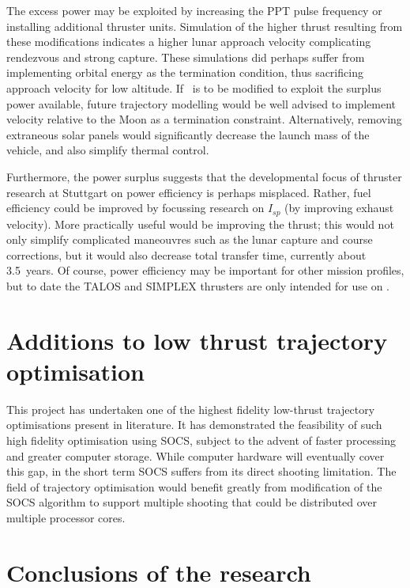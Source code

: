 The excess power may be exploited by increasing the PPT pulse frequency or installing additional thruster units. Simulation of the higher thrust resulting from these modifications indicates a higher lunar approach velocity complicating rendezvous and strong capture. These simulations did perhaps suffer from implementing orbital energy as the termination condition, thus sacrificing approach velocity for low altitude. If \BW\ is to be modified to exploit the surplus power available, future trajectory modelling would be well advised to implement velocity relative to the Moon as a termination constraint. Alternatively, removing extraneous solar panels would significantly decrease the launch mass of the vehicle, and also simplify thermal control. 

Furthermore, the power surplus suggests that the developmental focus of thruster research at Stuttgart on power efficiency is perhaps misplaced. Rather, fuel efficiency could be improved by focussing research on $I_{sp}$ (by improving exhaust velocity). More practically useful would be improving the thrust; this would not only simplify complicated maneouvres such as the lunar capture and course corrections, but it would also decrease total transfer time, currently about 3.5~years. Of course, power efficiency may be important for other mission profiles, but to date the TALOS and SIMPLEX thrusters are only intended for use on \BW.








\section{Additions to low thrust trajectory optimisation} \label{sec:Optimisation-additions}

This project has undertaken one of the highest fidelity low-thrust trajectory optimisations present in literature. It has  demonstrated the feasibility of such high fidelity optimisation using SOCS, subject to the advent of faster processing and greater computer storage. While computer hardware will eventually cover this gap, in the short term SOCS suffers from its direct shooting limitation. The field of trajectory optimisation would benefit greatly from modification of the SOCS algorithm to support multiple shooting that could be distributed over multiple processor cores.




\section{Conclusions of the research}

